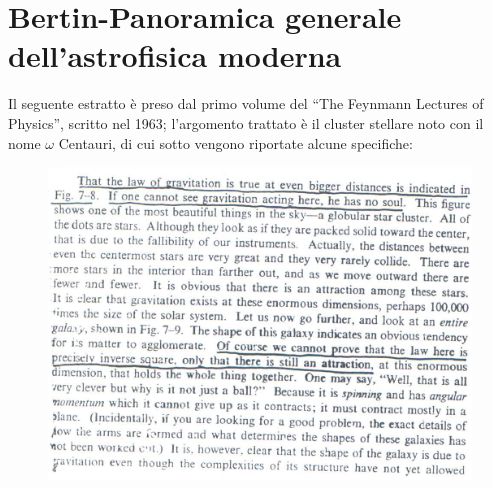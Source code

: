 \chapter[Bertin-Panoramica]{Bertin-Panoramica generale dell'astrofisica moderna}

Il seguente estratto è preso dal primo volume del ``The Feynmann Lectures of Physics'', scritto nel 1963; l'argomento trattato è il cluster stellare noto con il nome $\omega$ Centauri, di cui sotto vengono riportate alcune specifiche:

\begin{figure}[h!]
\centering
\includegraphics[width=1\textwidth]{Img/bertin_1.png}
\end{figure}

